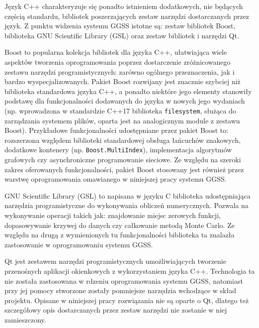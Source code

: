 

\clearpage
Język C++ charakteryzuje się ponadto istnieniem dodatkowych, nie będących częścią standardu, bibliotek poszerzających zestaw narzędzi dostarczanych przez język. Z punktu widzenia systemu GGSS istotne są: zestaw bibliotek Boost, biblioteka GNU Scientific Library (GSL) oraz zestaw bibliotek i narzędzi Qt.

Boost to popularna kolekcja bibliotek dla języka C++, ułatwiająca wiele aspektów tworzenia oprogramowania poprzez dostarczenie zróżnicowanego zestawu narzędzi programistycznych: zarówno ogólnego przeznaczenia, jak i bardzo wyspecjalizowanych. Pakiet Boost rozwijany jest znacznie szybciej niż biblioteka standardowa języka C++, a ponadto niektóre jego elementy stanowiły podstawę dla funkcjonalności dodawanych do języka w nowych jego wydaniach (np. wprowadzona w standardzie C++17 biblioteka \lstinline{filesystem}, służąca do zarządzania systemem plików, oparta jest na analogicznym module z zestawu Boost). Przykładowe funkcjonalności udostępniane przez pakiet Boost to: rozszerzona względem biblioteki standardowej obsługa łańcuchów znakowych, dodatkowe kontenery (np. \lstinline{Boost.MultiIndex}), implementacja algorytmów grafowych czy asynchroniczne programowanie sieciowe. Ze względu na szeroki zakres oferowanych funkcjonalności, pakiet Boost stosowany jest również przez warstwę oprogramowania omawianego w niniejszej pracy systemu GGSS.

GNU Scientific Library (GSL) to napisana w języku C biblioteka udostępniająca narzędzia programistyczne do wykonywania obliczeń numerycznych. Pozwala na wykonywanie operacji takich jak: znajdowanie miejsc zerowych funkcji, dopasowywanie krzywej do danych czy całkowanie metodą Monte Carlo. Ze względu na drugą z wymienionych tu funkcjonalności biblioteka ta znalazła zastosowanie w oprogramowaniu systemu GGSS.

Qt jest zestawem narzędzi programistycznych umożliwiających tworzenie przenośnych aplikacji okienkowych z wykorzystaniem języka C++. Technologia ta nie została zastosowana w rdzeniu oprogramowania systemu GGSS, natomiast przy jej pomocy stworzone zostały pomniejsze narzędzia wchodzące w skład projektu. Opisane w niniejszej pracy rozwiązania nie są oparte o Qt, dlatego też szczegółowy opis dostarczanych przez zestaw narzędzi nie zostanie w niej zamieszczony.


